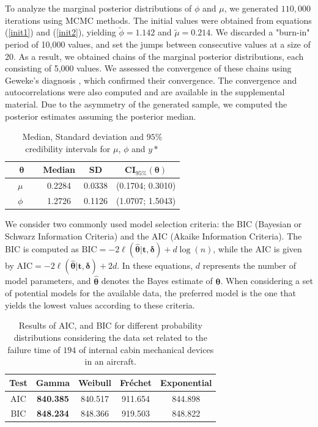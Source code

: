 To analyze the marginal posterior distributions of $\phi$ and $\mu$, we generated $110,000$ iterations using MCMC methods. The initial values were obtained from equations (\ref{init1}) and (\ref{init2}), yielding $\tilde{\phi}=1.142$ and $\tilde{\mu}=0.214$. We discarded a "burn-in" period of 10,000 values, and set the jumps between consecutive values at a size of 20. As a result, we obtained chains of the marginal posterior distributions, each consisting of 5,000 values. We assessed the convergence of these chains using Geweke's diagnosis \cite{geweke1991evaluating}, which confirmed their convergence. The convergence and autocorrelations were also computed and are available in the supplemental material. Due to the asymmetry of the generated sample, we computed the posterior estimates assuming the posterior median.
\begin{table}[!h]
	\caption{Median, Standard deviation and  $95\%$ credibility intervals for $\mu$, $\phi$ and $y*$}
	\centering %
{\small
	{\begin{tabular}{ c | c |  c| c }
			\hline
			$\boldsymbol{\theta}$  & Median & SD & CI$_{95\%}(\boldsymbol{\theta})$ \\ \hline
			\ \ $\mu$ \ \   & 0.2284 &  0.0338  &  (0.1704; 0.3010)  \\ \hline
			\ \ $\phi$   \ \  &  1.2726 & 0.1126 &  (1.0707; 1.5043) \\ \hline
		\end{tabular}}\label{resairplane} }
\end{table}

We consider two commonly used model selection criteria: the BIC (Bayesian or Schwarz Information Criteria) and the AIC (Akaike Information Criteria). The BIC is computed as $\text{BIC} = -2 \ell(\hat{\boldsymbol{\theta}}|\boldsymbol{t,\delta}) + d\log(n)$, while the AIC is given by $\text{AIC} = -2 \ell(\hat{\boldsymbol{\theta}}|\boldsymbol{t,\delta}) + 2d$. In these equations, $d$ represents the number of model parameters, and $\hat{\boldsymbol{\theta}}$ denotes the Bayes estimate of $\boldsymbol{\theta}$. When considering a set of potential models for the available data, the preferred model is the one that yields the lowest values according to these criteria.

\begin{table}[!h]
\centering %
	\caption{Results of AIC, and BIC for different probability distributions considering the data set related to the failure time of $194$ of internal cabin mechanical devices in an aircraft.}

	{\begin{tabular}{c|c|c|c|c}
			\hline
			Test   &  Gamma & Weibull & Fréchet & Exponential \\ \hline
			AIC    & \textbf{840.385} & 840.517 & 911.654 & 844.898 \\ 
			BIC    & \textbf{848.234} & 848.366 & 919.503 & 848.822  \\ \hline
		\end{tabular}}\label{discairplane}
\end{table}

